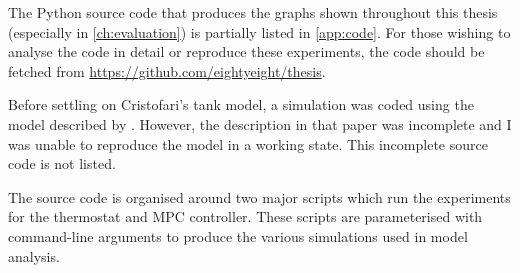 The Python source code that produces the graphs shown throughout this thesis (especially in \autoref{ch:evaluation}) is partially listed in \autoref{app:code}.
For those wishing to analyse the code in detail or reproduce these experiments, the code should be fetched from \url{https://github.com/eightyeight/thesis}.

Before settling on Cristofari's tank model, a simulation was coded using the model described by \textcite{Pfeiffer11}.
However, the description in that paper was incomplete and I was unable to reproduce the model in a working state.
This incomplete source code is not listed.

The source code is organised around two major scripts which run the experiments for the thermostat and MPC controller.
These scripts are parameterised with command-line arguments to produce the various simulations used in model analysis.
